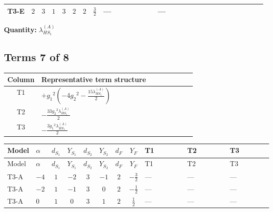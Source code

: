 \documentclass[8pt]{article}
\begin{document}
\begin{landscape}
\begin{longtable}{@{}llcccccc >{\raggedright\arraybackslash}p{0.21\linewidth} >{\raggedright\arraybackslash}p{0.21\linewidth} >{\raggedright\arraybackslash}p{0.21\linewidth}@{}}
\midrule
T3-E & $2$ & $3$ & $1$ & $3$ & $2$ & $2$ & $\frac{3}{2}$ & --- & --- & \scriptsize\adjustbox{max width=\linewidth}{$\begin{gathered} {\lambda_{HS_1}^{(A)}} (2 T_{\nu}^{(1)}+6 \operatorname{Tr}\!\left({Y_d}\,\left({Y_d}\right)^{\dagger}\right)+2 \operatorname{Tr}\!\left({Y_e}\,\left({Y_e}\right)^{\dagger}\right)+6 \operatorname{Tr}\!\left({Y_u}\,\left({Y_u}\right)^{\dagger}\right)+16 {\lambda_{S_1}^{(A)}})\end{gathered}$} \\
\midrule
\bottomrule
\end{longtable}
\clearpage
\noindent\textbf{Quantity: }$\lambda_{HS_1}^{(A)}$\par\smallskip
\subsection*{Terms 7 of 8}
\begin{center}
\begin{tabular}{@{}c >{\raggedright\arraybackslash}p{0.82\linewidth}@{}}
\toprule
Column & Representative term structure \\
\midrule
T1 & \(\displaystyle +{g_1}^2 \left(-4 {g_2}^2-\frac{15 {\lambda_{HS_1}^{(A)}}}{2}\right)\) \\
\midrule
T2 & \(\displaystyle -\frac{33 {g_2}^2 {\lambda_{HS_1}^{(A)}}}{2}\) \\
\midrule
T3 & \(\displaystyle -\frac{3 {g_1}^2 {\lambda_{HS_1}^{(A)}}}{2}\) \\
\midrule
\bottomrule
\end{tabular}
\end{center}
\smallskip
\tiny
\begin{longtable}{@{}llcccccc >{\raggedright\arraybackslash}p{0.21\linewidth} >{\raggedright\arraybackslash}p{0.21\linewidth} >{\raggedright\arraybackslash}p{0.21\linewidth}@{}}
\toprule
Model & $\alpha$ & $d_{S_1}$ & $Y_{S_1}$ & $d_{S_2}$ & $Y_{S_2}$ & $d_F$ & $Y_F$ & T1 & T2 & T3 \\
\midrule
\endfirsthead
\toprule
Model & $\alpha$ & $d_{S_1}$ & $Y_{S_1}$ & $d_{S_2}$ & $Y_{S_2}$ & $d_F$ & $Y_F$ & T1 & T2 & T3 \\
\midrule
\endhead
T3-A & $-4$ & $1$ & $-2$ & $3$ & $-1$ & $2$ & $-\frac{3}{2}$ & --- & --- & --- \\
\midrule
T3-A & $-2$ & $1$ & $-1$ & $3$ & $0$ & $2$ & $-\frac{1}{2}$ & --- & --- & --- \\
\midrule
T3-A & $0$ & $1$ & $0$ & $3$ & $1$ & $2$ & $\frac{1}{2}$ & --- & --- & --- \\

\end{longtable}
\end{landscape}
\end{document}

